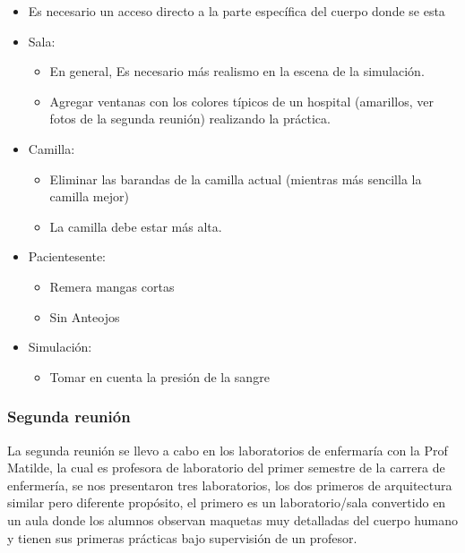 \begin{itemize}
\itemsep1pt\parskip0pt
\item
  Es necesario un acceso directo a la parte específica del cuerpo donde
  se esta
\item
  Sala:

  \begin{itemize}
  \itemsep1pt\parskip0pt
  \item
    En general, Es necesario más realismo en la escena de la simulación.
  \item
    Agregar ventanas con los colores típicos de un hospital (amarillos,
    ver fotos de la segunda reunión) realizando la práctica.
  \end{itemize}
\item
  Camilla:

  \begin{itemize}
  \itemsep1pt\parskip0pt
  \item
    Eliminar las barandas de la camilla actual (mientras más sencilla la
    camilla mejor)
  \item
    La camilla debe estar más alta.
  \end{itemize}
\item
  Pacientesente:

  \begin{itemize}
  \itemsep1pt\parskip0pt
  \item
    Remera mangas cortas
  \item
    Sin Anteojos
  \end{itemize}
\item
  Simulación:

  \begin{itemize}
  \itemsep1pt\parskip0pt
  \item
    Tomar en cuenta la presión de la sangre
  \end{itemize}
\end{itemize}

\subsubsection{Segunda reunión}

La segunda reunión se llevo a cabo en los laboratorios de enfermaría con
la Prof Matilde, la cual es profesora de laboratorio del primer semestre
de la carrera de enfermería, se nos presentaron tres laboratorios, los
dos primeros de arquitectura similar pero diferente propósito, el
primero es un laboratorio/sala convertido en un aula donde los alumnos
observan maquetas muy detalladas del cuerpo humano y tienen sus primeras
prácticas bajo supervisión de un profesor.

